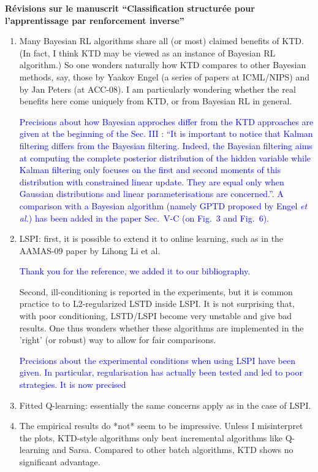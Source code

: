 \documentclass[11pt, a4paper]{letter}
\begin{document}
\begin{letter}{\large \textbf{Révisions sur le manuscrit ``Classification structurée pour l'apprentissage par renforcement inverse''}}
\begin{enumerate}
\item  Many Bayesian RL algorithms share all (or most) claimed benefits
 of KTD.  (In fact, I think KTD may be viewed as an instance of Bayesian RL
 algorithm.)  So one wonders naturally how KTD compares to other Bayesian
 methods, say, those by Yaakov Engel (a series of papers at ICML/NIPS) and
 by Jan Peters (at ACC-08).  I am particularly wondering whether the real
 benefits here come uniquely from KTD, or from Bayesian RL in general.

\textcolor{blue}{  Precisions about how Bayesian approches differ
from the KTD approaches are given at the beginning of the Sec. III :
``It is important to notice that Kalman filtering differs from the
Bayesian filtering. Indeed, the Bayesian filtering aims at computing
the complete posterior distribution of the hidden variable while
Kalman filtering only focuses on the first and second moments of
this distribution with constrained linear update. They are equal
only when Gaussian distributions and linear parameterisations are
concerned.''. A comparison with a Bayesian algorithm (namely GPTD
proposed by Engel \textit{et al.}) has been added in the paper
Sec.~V-C (on Fig.~3 and Fig.~6).}

\item  LSPI: first, it is possible to extend it to online learning, such
 as in the AAMAS-09 paper by Lihong Li et al.

\textcolor{blue}{Thank you for the reference, we added it to our
bibliography.}

Second, ill-conditioning is
 reported in the experiments, but it is common practice to to L2-regularized
 LSTD inside LSPI.  It is not surprising that, with poor conditioning,
 LSTD/LSPI become very unstable and give bad results.  One thus wonders
 whether these algorithms are implemented in the 'right' (or robust) way to
 allow for fair comparisons.

\textcolor{blue}{Precisions about the experimental conditions when
using LSPI have been given. In particular, regularisation has
actually been tested and led to poor strategies. It is now precised}

\item Fitted Q-learning: essentially the same concerns apply as in the
 case of LSPI.

\item  The empirical results do *not* seem to be impressive.  Unless I
 misinterpret the plots, KTD-style algorithms only beat incremental
 algorithms like Q-learning and Sarsa.  Compared to other batch algorithms,
 KTD shows no significant advantage.


\end{enumerate}
\end{letter}
\end{document}
